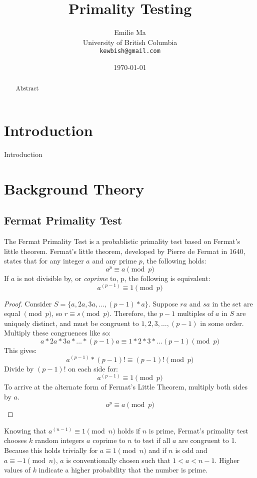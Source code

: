 \documentclass{article}
\title[Primality Testing]{Primality Testing}
\author[Emilie Ma]{%
Emilie Ma\\%
University of British Columbia\\%
\texttt{kewbish@gmail.com}%
}
\date{\today}
\begin{document}
\maketitle
\newpage
\begin{abstract}
    Abstract
\end{abstract}

\section{Introduction}
Introduction

\section{Background Theory}

\subsection{Fermat Primality Test}
The Fermat Primality Test is a probablistic primality test based on Fermat's little theorem.
Fermat's little theorem, developed by Pierre de Fermat in 1640, states that for any integer $a$ and any prime $p$, the following holds:
\[
    a^p \equiv a \pmod{p} 
\]
If $a$ is not divisible by, or \emph{coprime} to, p, the following is equivalent:
\[
    a^{(p - 1)} \equiv 1 \pmod{p} 
\]

\begin{proof} %
Consider $S = \{a, 2a, 3a, \ldots{}, (p - 1) * a\}$.
Suppose $ra$ and $sa$ in the set are equal $\pmod{p}$, so $r \equiv s \pmod{p}$.
Therefore, the $p - 1$ multiples of $a$ in $S$ are uniquely distinct, and must be congruent to ${1, 2, 3, \ldots{}, (p - 1)}$ in some order.
Multiply these congruences like so:
    \[a * 2a * 3a * \ldots{} * (p - 1)a \equiv 1 * 2 * 3 * \ldots{} (p - 1) \pmod{p}\]
This gives:
    \[a^{(p - 1)} * (p - 1)! \equiv (p - 1)! \pmod{p}\]
Divide by $(p - 1)!$ on each side for:
    \[a^{(p - 1)} \equiv 1 \pmod{p}\]
To arrive at the alternate form of Fermat's Little Theorem, multiply both sides by $a$.
    \[a^p \equiv a \pmod{p}\]
\end{proof}

Knowing that $a^{(n - 1)} \equiv 1 \pmod{n}$ holds if $n$ is prime, Fermat's primality test chooses $k$ random integers $a$ coprime to $n$ to test if all $a$ are congruent to 1. Because this holds trivially for $a \equiv 1 \pmod{n}$ and if $n$ is odd and $a \equiv -1 \pmod{n}$, $a$ is conventionally chosen such that $1 < a < n - 1$. Higher values of $k$ indicate a higher probability that the number is prime.
\end{document}
